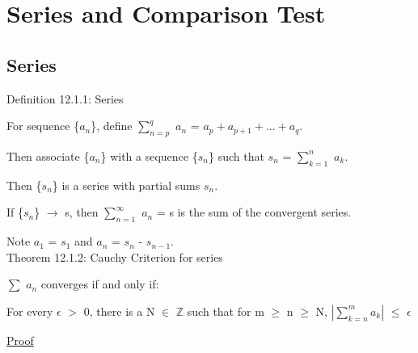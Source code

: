\newpage

\section[Day 12: Series \& Comparison Test]{Series and Comparison Test}

\subsection{ Series }

{ \color{blue} Definition 12.1.1: Series }

    \begin{adjustbox}{minipage=14cm, right, vspace=0.1cm 0cm}
        For sequence \{$a_n$\}, define $\sum_{n=p}^q$ $a_n$
        = $a_p + a_{p+1} + ... + a_q$.

        Then associate \{$a_n$\} with a sequence \{$s_n$\}
        such that $s_n$ = $\sum_{k=1}^n$ $a_k$.

        Then \{$s_n$\} is a series with partial sums $s_n$.

        If \{$s_n$\} $\rightarrow$ s, then
        $\sum_{n=1}^{\infty}$ $a_n$ = s
        is the sum of the convergent series.
        
        Note $a_1$ = $s_1$ and $a_n$ = $s_n$ - $s_{n-1}$. \\
    \end{adjustbox}

{ \color{red} Theorem 12.1.2: Cauchy Criterion for series }

    \begin{adjustbox}{minipage=14cm, right, vspace=0.1cm 0cm}
        $\sum$ $a_n$ converges if and only if:
        
        \hspace{0.5cm}
        For every $\epsilon$ $>$ 0, there is a N $\in$ $\mathbb{Z}$
        such that for m $\geq$ n $\geq$ N,
        $| \sum_{k=n}^m a_k |$ $\leq$ $\epsilon$
    \end{adjustbox}

{ \color{magenta} \underline{Proof} }

